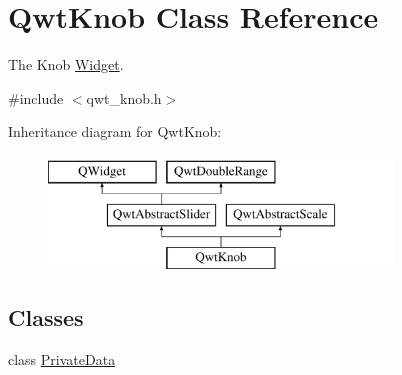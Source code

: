 \hypertarget{class_qwt_knob}{\section{Qwt\-Knob Class Reference}
\label{class_qwt_knob}
}


The Knob \hyperlink{class_widget}{Widget}.  




{\ttfamily \#include $<$qwt\-\_\-knob.\-h$>$}

Inheritance diagram for Qwt\-Knob\-:\begin{figure}[H]
\begin{center}
\leavevmode
\includegraphics[height=3.000000cm]{class_qwt_knob}
\end{center}
\end{figure}
\subsection*{Classes}
\begin{DoxyCompactItemize}
\item 
class \hyperlink{class_qwt_knob_1_1_private_data}{Private\-Data}
\end{DoxyCompactItemize}
